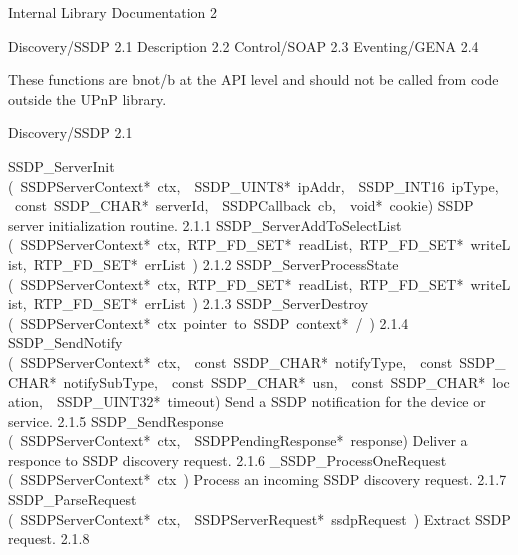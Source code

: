 \documentclass{article}
\begin{document}
\begin{cxxentry}
{}
        {Internal Library Documentation}
        {}
        {}
        {2}
\begin{cxxnames}
\cxxitem{}
        {Discovery/SSDP}
        {}
        {}
        {2.1}
\cxxitem{}
        {Description}
        {}
        {}
        {2.2}
\cxxitem{}
        {Control/SOAP}
        {}
        {}
        {2.3}
\cxxitem{}
        {Eventing/GENA}
        {}
        {}
        {2.4}
\end{cxxnames}
\begin{cxxdoc}
These functions are \<b\>not\</b\> at the API level and should not be called from
code outside the UPnP library. 
\end{cxxdoc}
\begin{cxxentry}
{}
        {Discovery/SSDP}
        {}
        {}
        {2.1}
\begin{cxxnames}
        {SSDP\_ServerInit}
        {(\ SSDPServerContext*\ ctx,\ \ SSDP\_UINT8*\ ipAddr,\ \ SSDP\_INT16\ ipType,\ \ const\ SSDP\_CHAR*\ serverId,\ \ SSDPCallback\ cb,\ \ void*\ cookie)}
        {SSDP server initialization routine. }
        {2.1.1}
        {SSDP\_ServerAddToSelectList}
        {(\ SSDPServerContext*\ ctx,\ RTP\_FD\_SET*\ readList,\ RTP\_FD\_SET*\ writeList,\ RTP\_FD\_SET*\ errList\ )}
        {}
        {2.1.2}
        {SSDP\_ServerProcessState}
        {(\ SSDPServerContext*\ ctx,\ RTP\_FD\_SET*\ readList,\ RTP\_FD\_SET*\ writeList,\ RTP\_FD\_SET*\ errList\ )}
        {}
        {2.1.3}
        {SSDP\_ServerDestroy}
        {(\ SSDPServerContext*\ ctx\ pointer\ to\ SSDP\ context*\ /\ )}
        {}
        {2.1.4}
        {SSDP\_SendNotify}
        {(\ SSDPServerContext*\ ctx,\ \ const\ SSDP\_CHAR*\ notifyType,\ \ const\ SSDP\_CHAR*\ notifySubType,\ \ const\ SSDP\_CHAR*\ usn,\ \ const\ SSDP\_CHAR*\ location,\ \ SSDP\_UINT32*\ timeout)}
        {Send a SSDP notification for the device or service. }
        {2.1.5}
        {SSDP\_SendResponse}
        {(\ SSDPServerContext*\ ctx,\ \ SSDPPendingResponse*\ response)}
        {Deliver a responce to SSDP discovery request.}
        {2.1.6}
        {\_SSDP\_ProcessOneRequest}
        {(\ SSDPServerContext*\ ctx\ )}
        {Process an incoming SSDP discovery request. }
        {2.1.7}
        {SSDP\_ParseRequest}
        {(\ SSDPServerContext*\ ctx,\ \ SSDPServerRequest*\ ssdpRequest\ )}
        {Extract SSDP request. }
        {2.1.8}

\end{cxxnames}
\end{cxxentry}
\end{cxxentry}
\end{document}
